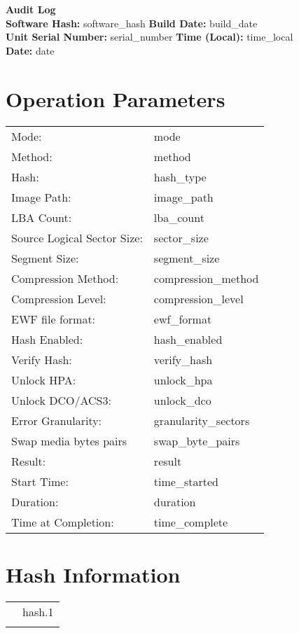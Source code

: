 \documentclass[a4paper,10pt]{article}
\begin{document}
\small

{\LARGE\textbf{Audit Log}}\\[1em]

\textbf{Software Hash:} {{ software_hash }} \hfill \textbf{Build Date:} {{ build_date }}\\
\textbf{Unit Serial Number:} {{ serial_number }} \hfill \textbf{Time (Local):} {{ time_local }}\\
\textbf{Date:} {{ date }}

\vspace{1em}
\section*{Operation Parameters}
\begin{tabular}{@{}ll}
Mode: & {{ mode }} \\
Method: & {{ method }} \\
Hash: & {{ hash_type }} \\
Image Path: & {{ image_path }} \\
LBA Count: & {{ lba_count }} \\
Source Logical Sector Size: & {{ sector_size }} \\
Segment Size: & {{ segment_size }} \\
Compression Method: & {{ compression_method }} \\
Compression Level: & {{ compression_level }} \\
EWF file format: & {{ ewf_format }} \\
Hash Enabled: & {{ hash_enabled }} \\
Verify Hash: & {{ verify_hash }} \\
Unlock HPA: & {{ unlock_hpa }} \\
Unlock DCO/ACS3: & {{ unlock_dco }} \\
Error Granularity: & {{ granularity_sectors }} \\
Swap media bytes pairs & {{ swap_byte_pairs }} \\
Result: & {{ result }} \\
Start Time: & {{ time_started }} \\
Duration: & {{ duration }} \\
Time at Completion: & {{ time_complete }} \\
\end{tabular}

\vspace{1em}
\section*{Hash Information}
\begin{tabular}{@{}ll}
{%
{{ hash.0 }}: & {{ hash.1 }} \\
{%
\end{tabular}
\end{document}
